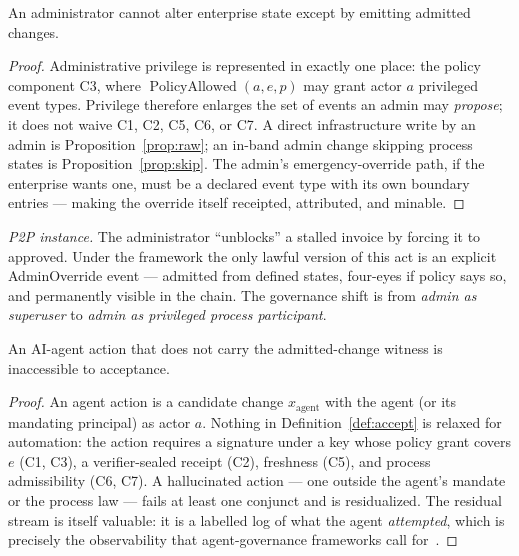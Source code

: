 \begin{proposition}
\label{prop:admin}
An administrator cannot alter enterprise state except by emitting admitted
changes.
\end{proposition}
\begin{proof}
Administrative privilege is represented in exactly one place: the policy
component C3, where $\operatorname{PolicyAllowed}(a, e, p)$ may grant actor $a$
privileged event types. Privilege therefore enlarges the set of events an
admin may \emph{propose}; it does not waive C1, C2, C5, C6, or C7. A direct
infrastructure write by an admin is Proposition~\ref{prop:raw}; an in-band
admin change skipping process states is Proposition~\ref{prop:skip}. The
admin's emergency-override path, if the enterprise wants one, must be a
declared event type with its own boundary entries --- making the override
itself receipted, attributed, and minable.
\end{proof}

\emph{P2P instance.} The administrator ``unblocks'' a stalled invoice by
forcing it to \textsf{approved}. Under the framework the only lawful version
of this act is an explicit \textsf{AdminOverride} event --- admitted from
defined states, four-eyes if policy says so, and permanently visible in the
chain. The governance shift is from \emph{admin as superuser} to \emph{admin
as privileged process participant}.

\begin{proposition}
\label{prop:agent}
An AI-agent action that does not carry the admitted-change witness is
inaccessible to acceptance.
\end{proposition}
\begin{proof}
An agent action is a candidate change $x_{\mathrm{agent}}$ with the agent (or
its mandating principal) as actor $a$. Nothing in
Definition~\ref{def:accept} is relaxed for automation: the action requires a
signature under a key whose policy grant covers $e$ (C1, C3), a verifier-sealed
receipt (C2), freshness (C5), and process admissibility (C6, C7). A
hallucinated action --- one outside the agent's mandate or the process law ---
fails at least one conjunct and is residualized. The residual stream is itself
valuable: it is a labelled log of what the agent \emph{attempted}, which is
precisely the observability that agent-governance frameworks
call for~\cite{ethos_ai_agents_2024,saura_llm_security_policies}.
\end{proof}

